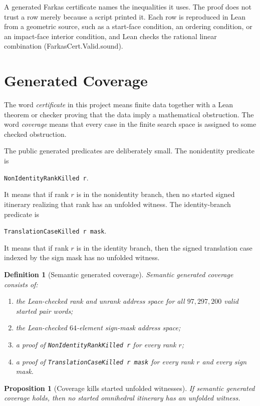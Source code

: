 \documentclass[11pt]{article}
\newtheorem{proposition}[theorem]{Proposition}
\newtheorem{definition}[theorem]{Definition}
\newcommand{\leanref}[1]{{\small\ttfamily #1}}
\begin{document}
A generated Farkas certificate names the inequalities it uses.  The proof
does not trust a row merely because a script printed it.  Each row is
reproduced in Lean from a geometric source, such as a start-face condition,
an ordering condition, or an impact-face interior condition, and Lean checks
the rational linear combination (\leanref{FarkasCert.Valid.sound}).

\section{Generated Coverage}
\label{sec:coverage}

The word \emph{certificate} in this project means finite data together with a
Lean theorem or checker proving that the data imply a mathematical
obstruction.  The word \emph{coverage} means that every case in the finite
search space is assigned to some checked obstruction.

The public generated predicates are deliberately small.  The nonidentity
predicate is
\begin{center}
  \texttt{NonIdentityRankKilled r}.
\end{center}
It means that if rank \(r\) is in the nonidentity branch, then no started
signed itinerary realizing that rank has an unfolded witness.  The
identity-branch predicate is
\begin{center}
  \texttt{TranslationCaseKilled r mask}.
\end{center}
It means that if rank \(r\) is in the identity branch, then the signed
translation case indexed by the sign mask has no unfolded witness.

\begin{definition}[Semantic generated coverage]
Semantic generated coverage consists of:
\begin{enumerate}[leftmargin=2em]
\item the Lean-checked rank and unrank address space for all
  \(97{,}297{,}200\) valid started pair words;
\item the Lean-checked \(64\)-element sign-mask address space;
\item a proof of \texttt{NonIdentityRankKilled r} for every rank \(r\);
\item a proof of \texttt{TranslationCaseKilled r mask} for every rank
  \(r\) and every sign mask.
\end{enumerate}
\end{definition}

\begin{proposition}[Coverage kills started unfolded witnesses]
If semantic generated coverage holds, then no started omnihedral itinerary
has an unfolded witness.
\end{proposition}
\end{document}
